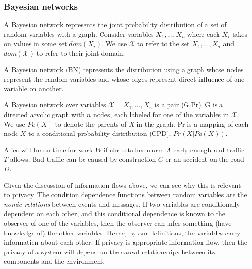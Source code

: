 \documentclass[../thesis.tex]{subfiles}
\begin{document}
\subsubsection{Bayesian networks}
\label{sec:orgheadline16}

A Bayesian network represents the joint probability distribution
of a set of random variables with a graph. Consider variables
\(X_1, ..., X_n\) where each \(X_i\) takes on values in some set
\(dom(X_i)\). We use \(\mathcal{X}\) to refer to the set \(X_1, ..., X_n\)
and \(dom(\mathcal{X})\) to refer to their joint domain.

A Bayesian network (BN) represents the distribution using a graph
whose nodes represent the random variables and whose edges represent
direct influence of one variable on another.

\begin{dfn}
A Bayesian network over variables $\mathcal{X} = X_1, ..., X_n$ is 
a pair (G,Pr). G is a directed acyclic graph with $n$ nodes, 
each labeled for one of the variables in $\mathcal{X}$. We use
$Pa(X)$ to denote the parents of $X$ in the graph. Pr is a mapping
of each node $X$ to a conditional probability distribution (CPD),
$Pr(X \vert Pa(X))$.
\end{dfn}

\begin{exm}
  Alice will be on time for work $W$ if she sets her
  alarm $A$ early enough and traffic $T$ allows.
  Bad traffic can be caused by construction $C$
  or an accident on the road $D$.
\end{exm}
\begin{center}
\end{center}

Given the discussion of information flows above,
we can see why this
is relevant to privacy. The condition dependence
functions between
random variables are the \emph{nomic relations}
between events and messages.
If two variables are conditionally dependent on
each other, and this
conditional dependence is known to the observer of one
of the variables,
then the observer can infer something (have knowledge of)
the other
variables. Hence, by our definitions, the variables carry
information about each other.
If privacy is appropriate information flow, then
the privacy of a system will depend on the
causal relationships between its components
and the environment.
\end{document}
